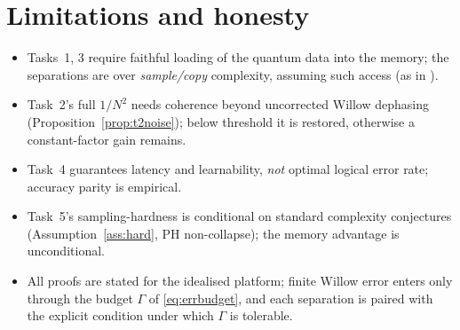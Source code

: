 \documentclass[11pt]{article}
\theoremstyle{plain}
\theoremstyle{definition}
\theoremstyle{remark}
\begin{document}
\section{Limitations and honesty}\label{sec:limits}
\begin{itemize}[leftmargin=1.4em]
\item Tasks~1, 3 require faithful loading of the quantum data into the memory; the separations are over \emph{sample/copy} complexity, assuming such access (as in \cite{LearnExp}).
\item Task~2's full $1/N^2$ needs coherence beyond uncorrected Willow dephasing (Proposition~\ref{prop:t2noise}); below threshold it is restored, otherwise a constant-factor gain remains.
\item Task~4 guarantees latency and learnability, \emph{not} optimal logical error rate; accuracy parity is empirical.
\item Task~5's sampling-hardness is conditional on standard complexity conjectures (Assumption~\ref{ass:hard}, PH non-collapse); the memory advantage is unconditional.
\item All proofs are stated for the idealised platform; finite Willow error enters only through the budget $\Gamma$ of \eqref{eq:errbudget}, and each separation is paired with the explicit condition under which $\Gamma$ is tolerable.
\end{itemize}
\end{document}
